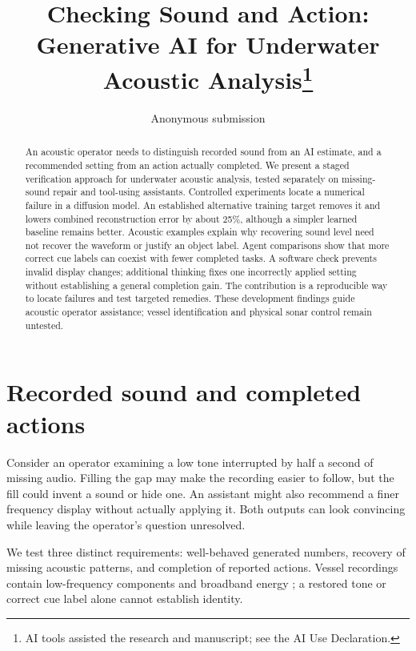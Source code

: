 \documentclass[runningheads,orivec]{llncs}
\begin{document}
\raggedbottom
\title{Checking Sound and Action: Generative AI for Underwater Acoustic Analysis\thanks{AI tools assisted the research and manuscript; see the AI Use Declaration.}}
\author{Anonymous submission}
\institute{}
\maketitle


\begin{abstract}
An acoustic operator needs to distinguish recorded sound from an AI estimate, and a recommended setting from an action actually completed. We present a staged verification approach for underwater acoustic analysis, tested separately on missing-sound repair and tool-using assistants. Controlled experiments locate a numerical failure in a diffusion model. An established alternative training target removes it and lowers combined reconstruction error by about 25\%, although a simpler learned baseline remains better. Acoustic examples explain why recovering sound level need not recover the waveform or justify an object label. Agent comparisons show that more correct cue labels can coexist with fewer completed tasks. A software check prevents invalid display changes; additional thinking fixes one incorrectly applied setting without establishing a general completion gain. The contribution is a reproducible way to locate failures and test targeted remedies. These development findings guide acoustic operator assistance; vessel identification and physical sonar control remain untested.
\end{abstract}

\section{Recorded sound and completed actions}

Consider an operator examining a low tone interrupted by half a second of missing audio. Filling the gap may make the recording easier to follow, but the fill could invent a sound or hide one. An assistant might also recommend a finer frequency display without actually applying it. Both outputs can look convincing while leaving the operator's question unresolved.

We test three distinct requirements: well-behaved generated numbers, recovery of missing acoustic patterns, and completion of reported actions. Vessel recordings contain low-frequency components and broadband energy \cite{veirs}; a restored tone or correct cue label alone cannot establish identity.
\end{document}
